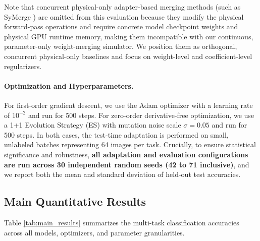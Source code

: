 Note that concurrent physical-only adapter-based merging methods (such as SyMerge \cite{jung2026symerge}) are omitted from this evaluation because they modify the physical forward-pass operations and require concrete model checkpoint weights and physical GPU runtime memory, making them incompatible with our continuous, parameter-only weight-merging simulator. We position them as orthogonal, concurrent physical-only baselines and focus on weight-level and coefficient-level regularizers.

\paragraph{Optimization and Hyperparameters.} For first-order gradient descent, we use the Adam optimizer with a learning rate of $10^{-2}$ and run for 500 steps. For zero-order derivative-free optimization, we use a 1+1 Evolution Strategy (ES) with mutation noise scale $\sigma=0.05$ and run for 500 steps. In both cases, the test-time adaptation is performed on small, unlabeled batches representing 64 images per task. Crucially, to ensure statistical significance and robustness, \textbf{all adaptation and evaluation configurations are run across 30 independent random seeds (42 to 71 inclusive)}, and we report both the mean and standard deviation of held-out test accuracies.

\subsection{Main Quantitative Results}
Table \ref{tab:main_results} summarizes the multi-task classification accuracies across all models, optimizers, and parameter granularities.

